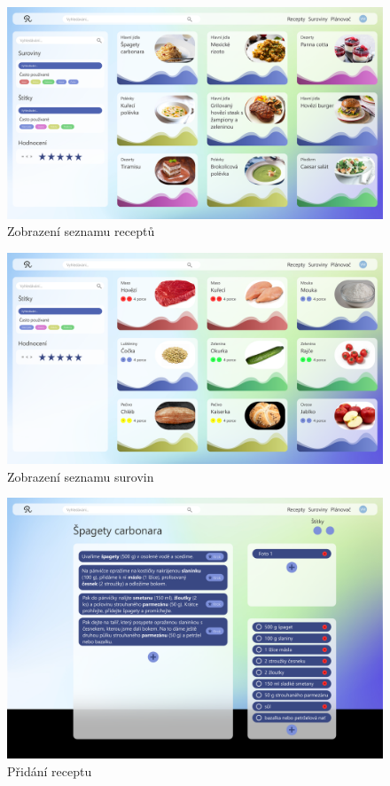 \begin{figure}[H]
    \includegraphics[width=\textwidth]{pdf/adobexd/recepty}
    \caption{Zobrazení seznamu receptů} \label{picture:recipeo:navrh:recepty}
\end{figure}

\begin{figure}[H]
    \includegraphics[width=\textwidth]{pdf/adobexd/suroviny}
    \caption{Zobrazení seznamu surovin} \label{picture:recipeo:navrh:suroviny}
\end{figure}

\begin{figure}[H]
    \includegraphics[width=\textwidth]{pdf/adobexd/vlozeni-receptu}
    \caption{Přidání receptu} \label{picture:recipeo:navrh:vlozeni-receptu}
\end{figure}

